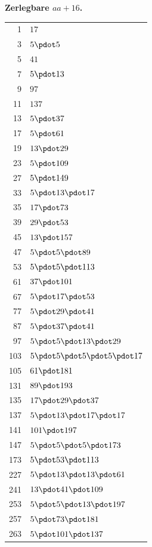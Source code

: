 \par{}
\begin{center}\textbf{Zerlegbare $aa+16$.}\end{center}
\begingroup\small\setlength{\tabcolsep}{5pt}
\begin{longtable}{@{}r|l@{}}
1 & $17$\\
3 & $5\pdot 5$\\
5 & $41$\\
7 & $5\pdot 13$\\
9 & $97$\\
11 & $137$\\
13 & $5\pdot 37$\\
17 & $5\pdot 61$\\
19 & $13\pdot 29$\\
23 & $5\pdot 109$\\
27 & $5\pdot 149$\\
33 & $5\pdot 13\pdot 17$\\
35 & $17\pdot 73$\\
39 & $29\pdot 53$\\
45 & $13\pdot 157$\\
47 & $5\pdot 5\pdot 89$\\
53 & $5\pdot 5\pdot 113$\\
61 & $37\pdot 101$\\
67 & $5\pdot 17\pdot 53$\\
77 & $5\pdot 29\pdot 41$\\
87 & $5\pdot 37\pdot 41$\\
97 & $5\pdot 5\pdot 13\pdot 29$\\
103 & $5\pdot 5\pdot 5\pdot 5\pdot 17$\\
105 & $61\pdot 181$\\
131 & $89\pdot 193$\\
135 & $17\pdot 29\pdot 37$\\
137 & $5\pdot 13\pdot 17\pdot 17$\\
141 & $101\pdot 197$\\
147 & $5\pdot 5\pdot 5\pdot 173$\\
173 & $5\pdot 53\pdot 113$\\
227 & $5\pdot 13\pdot 13\pdot 61$\\
241 & $13\pdot 41\pdot 109$\\
253 & $5\pdot 5\pdot 13\pdot 197$\\
257 & $5\pdot 73\pdot 181$\\
263 & $5\pdot 101\pdot 137$\\

\end{longtable}

